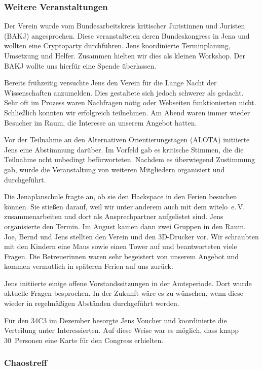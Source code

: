 \documentclass[ngerman]{scrartcl}
\begin{document}
\subsubsection{Weitere Veranstaltungen}

Der Verein wurde vom Bundesarbeitskreis kritischer Juristinnen und Juristen (BAKJ)
angesprochen. Diese veranstalteten deren Bundeskongress in Jena und wollten eine
Cryptoparty durchführen. Jens koordinierte Terminplanung, Umsetzung und
Helfer. Zusammen hielten wir dies als kleinen Workshop. Der BAKJ wollte uns
hierfür eine Spende überlassen.

Bereits frühzeitig versuchte Jens den Verein für die Lange Nacht der
Wissenschaften anzumelden. Dies gestaltete sich jedoch schwerer als
gedacht. Sehr oft im Prozess waren Nachfragen nötig oder Webseiten
funktionierten nicht. Schließlich konnten wir erfolgreich teilnehmen. Am Abend
waren immer wieder Besucher im Raum, die Interesse an unserem Angebot
hatten.

Vor der Teilnahme an den Alternativen Orientierungstagen (ALOTA) initiierte Jens
eine Abstimmung darüber. Im Vorfeld gab es kritische Stimmen, die die Teilnahme
ncht unbedingt befürworteten. Nachdem es überwiegend Zustimmung gab, wurde die
Veranstaltung von weiteren Mitgliedern organisiert und durchgeführt.

Die Jenaplanschule fragte an, ob sie den Hackspace in den Ferien besuchen
können. Sie stießen darauf, weil wir unter anderem auch mit dem
witelo~e.\,V. zusammenarbeiten und dort als Ansprechpartner aufgelistet
sind. Jens organisierte den Termin. Im August kamen dann zwei Gruppen in den
Raum. Joe, Bernd und Jens stellten den Verein und den 3D-Drucker vor. Wir
schraubten mit den Kindern eine Maus sowie einen Tower auf und beantworteten
viele Fragen. Die Betreuerinnen waren sehr begeistert von unserem Angebot und
kommen vermutlich in späteren Ferien auf uns zurück.

Jens initiierte einige offene Vorstandssitzungen in der Amtsperiode. Dort wurde
aktuelle Fragen besprochen. In der Zukunft wäre es zu wünschen, wenn diese
wieder in regelmäßigen Abständen durchgeführt werden.

Für den 34C3 im Dezember besorgte Jens Voucher und koordinierte die Verteilung
unter Interessierten. Auf diese Weise war es möglich, dass knapp 30~Personen
eine Karte für den Congress erhielten.


\subsubsection{Chaostreff}
\label{sec:ct}
\end{document}
